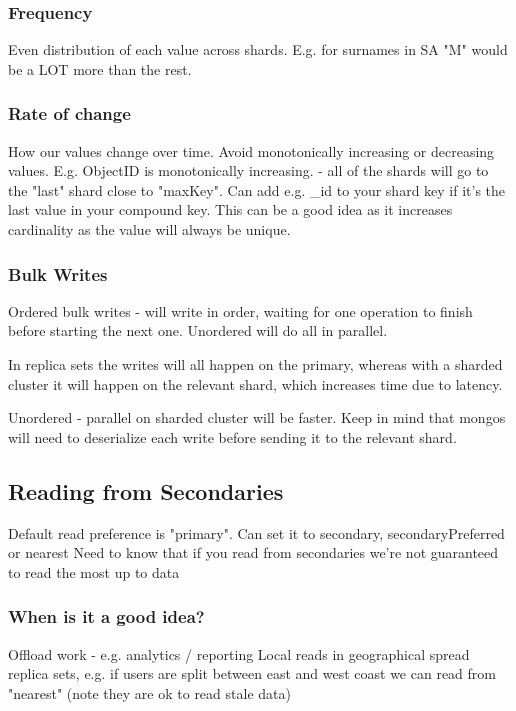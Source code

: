 \documentclass[11pt]{article}
\begin{document}
\subsubsection{Frequency}
\label{sec:orgf9b8355}
Even distribution of each value across shards. E.g. for surnames in SA "M" would be a LOT more than the rest.

\subsubsection{Rate of change}
\label{sec:org7e3b996}
How our values change over time. Avoid monotonically increasing or decreasing values. E.g. ObjectID is monotonically increasing. - all of the shards will go to the "last" shard close to "maxKey".
Can add e.g. \_id to your shard key if it's the last value in your compound key. This can be a good idea as it increases cardinality as the value will always be unique.

\subsubsection{Bulk Writes}
\label{sec:org961aba7}
Ordered bulk writes - will write in order, waiting for one operation to finish before starting the next one. Unordered will do all in parallel.

In replica sets the writes will all happen on the primary, whereas with a sharded cluster it will happen on the relevant shard, which increases time due to latency.

Unordered - parallel on sharded cluster will be faster. Keep in mind that mongos will need to deserialize each write before sending it to the relevant shard.

\subsection{Reading from Secondaries}
\label{sec:org2907cbc}
Default read preference is "primary".
Can set it to secondary, secondaryPreferred or nearest
Need to know that if you read from secondaries we're not guaranteed to read the most up to data

\subsubsection{When is it a good idea?}
\label{sec:org4fe6809}
Offload work - e.g. analytics / reporting
Local reads in geographical spread replica sets, e.g. if users are split between east and west coast we can read from "nearest" (note they are ok to read stale data)
\end{document}
